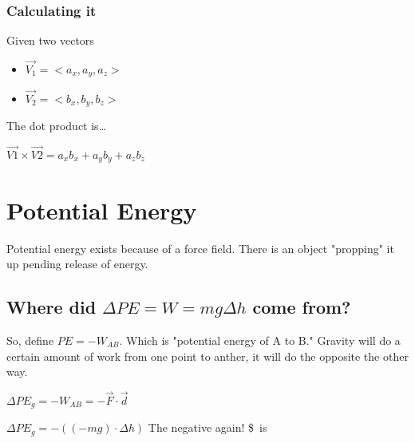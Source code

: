 \documentclass[letterpaper]{article}
\begin{document}
\subsubsection{Calculating it}
\label{sec:org6cfe768}
Given two vectors

\begin{itemize}
\item \(\vec{V_1} = <a_x, a_y, a_z>\)
\item \(\vec{V_2} = <b_x, b_y, b_z>\)
\end{itemize}

The dot product is\ldots{}

\(\vec{V1} \times \vec{V2} = a_x b_x + a_y b_y + a_z b_z\)

\section{Potential Energy}
\label{sec:orgbc617f0}
Potential energy exists because of a force field. There is an object
"propping" it up pending release of energy.

\subsection{Where did \(\Delta PE = W = mg \Delta h\) come from?}
\label{sec:org419cb61}
So, define \(PE = -W_{AB}\). Which is "potential energy of A to B."
Gravity will do a certain amount of work from one point to anther, it
will do the opposite the other way.

\(\Delta PE_g = -W_{AB} = -\vec{F} \cdot \vec{d}\)

\(\Delta PE_g = -((-mg) \cdot \Delta h)\) The negative again! \$ is
\end{document}
